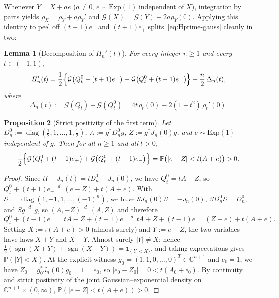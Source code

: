\documentclass[11pt,a4paper]{article}
\newcommand{\C}{\mathbb{C}}
\newcommand{\Prob}{\mathbb{P}}
\newcommand{\G}{\mathcal{G}}
\newcommand{\sgn}{\operatorname{sgn}}
\newcommand{\diag}{\operatorname{diag}}
\newtheorem{proposition}{Proposition}[section]
\newtheorem{lemma}[proposition]{Lemma}
\theoremstyle{remark}
\numberwithin{equation}{section}
\begin{document}
Whenever $Y = X + ae$ ($a \neq 0$, $e \sim \mathrm{Exp}(1)$ independent of $X$), integration by parts yields $\rho_X = \rho_Y + a\rho_Y'$ and $\G(X) = \G(Y) - 2a\rho_Y(0)$. Applying this identity to peel off $(t - 1)e_-$ and $(t + 1)e_+$ splits~\eqref{eq:Hprime-gauss} cleanly in two:

\begin{lemma}[Decomposition of $H_n'(t)$]
    \label{lem:decomp}
    For every integer $n \ge 1$ and every $t \in (-1,1)$,
    \begin{equation}
        H_n'(t)
        = \frac12\Bigl\{\G\bigl(Q_t^0 + (t+1)e_+\bigr) + \G\bigl(Q_t^0 + (t-1)e_-\bigr)\Bigr\}
          + \frac{n}{2}\,\Delta_n(t),
        \label{eq:comp}
    \end{equation}
    where
    \begin{equation}
        \Delta_n(t) := \G(Q_t) - \G(Q_t^0) = 4t\,\rho_t(0) - 2(1 - t^2)\,\rho_t'(0).
        \label{eq:delta-def}
    \end{equation}
\end{lemma}

\begin{proposition}[Strict positivity of the first term]
    \label{prop:first-term}
    Let $D_n^0 := \diag(\frac12, 1, \dots, 1, \frac12)$, $A := g^* D_n^0 g$, $Z := g^* J_n(0) g$, and $e \sim \mathrm{Exp}(1)$ independent of $g$. Then for all $n \ge 1$ and all $t > 0$,
    \[
        \frac12\Bigl\{\G\bigl(Q_t^0 + (t+1)e_+\bigr) + \G\bigl(Q_t^0 + (t-1)e_-\bigr)\Bigr\}
        = \Prob\bigl(|e - Z| < t(A + e)\bigr) > 0.
    \]
\end{proposition}

\begin{proof}
Since $tI - J_n(t) = tD_n^0 - J_n(0)$, we have $Q_t^0 = tA - Z$, so $Q_t^0 + (t+1)e_+ \overset{d}{=} (e - Z) + t(A + e)$. With $S := \diag(1, -1, 1, \dots, (-1)^n)$, we have $S J_n(0) S = -J_n(0)$, $S D_n^0 S = D_n^0$, and $Sg \overset{d}{=} g$, so $(A, -Z) \overset{d}{=} (A, Z)$ and therefore
\[
    Q_t^0 + (t-1)e_-
    = tA - Z + (t-1)e_-
    \overset{d}{=} tA + Z + (t-1)e
    = (Z - e) + t(A + e).
\]
Setting $X := t(A + e) > 0$ (almost surely) and $Y := e - Z$, the two variables have laws $X + Y$ and $X - Y$. Almost surely $|Y| \neq X$; hence $\frac12(\sgn(X+Y) + \sgn(X-Y)) = \mathbf{1}_{\{|Y| < X\}}$, and taking expectations gives $\Prob(|Y| < X)$. At the explicit witness $g_0 = (1, 1, 0, \dots, 0)^T \in \C^{n+1}$ and $e_0 = 1$, we have $Z_0 = g_0^* J_n(0) g_0 = 1 = e_0$, so $|e_0 - Z_0| = 0 < t(A_0 + e_0)$. By continuity and strict positivity of the joint Gaussian--exponential density on $\C^{n+1} \times (0, \infty)$, $\Prob(|e - Z| < t(A + e)) > 0$.
\end{proof}
\end{document}
